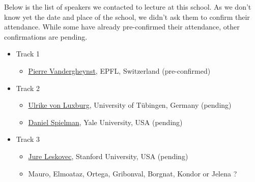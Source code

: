 \documentclass[a4paper]{scrartcl}
\begin{document}
Below is the list of speakers we contacted to lecture at this school. As we
don't know yet the date and place of the school, we didn't ask them to confirm
their attendance. While some have already pre-confirmed their attendance, other
confirmations are pending.
\begin{itemize}
\setlength{\itemsep}{0pt} \setlength{\parskip}{0pt}
\item Track 1
	\begin{itemize}
	\setlength{\itemsep}{0pt} \setlength{\parskip}{0pt}
	\item \href{http://people.epfl.ch/pierre.vandergheynst}
		{Pierre Vandergheynst}, EPFL, Switzerland
		(pre-confirmed)
	\end{itemize}
\item Track 2
	\begin{itemize}
	\setlength{\itemsep}{0pt} \setlength{\parskip}{0pt}
	\item \href{http://www.wsi.uni-tuebingen.de/lehrstuehle/theory-of-machine-learning/people/ulrike-von-luxburg.htmli}
		{Ulrike von Luxburg}, University of Tübingen, Germany
		(pending)
	\item \href{http://www.cs.yale.edu/homes/spielman/}
		{Daniel Spielman}, Yale University, USA
		(pending)
	\end{itemize}
\item Track 3
	\begin{itemize}
	\setlength{\itemsep}{0pt} \setlength{\parskip}{0pt}
	\item \href{http://cs.stanford.edu/people/jure/}
		{Jure Leskovec}, Stanford University, USA
		(pending)
	\item Mauro, Elmoataz, Ortega, Gribonval, Borgnat, Kondor or Jelena ?
	\end{itemize}
\end{itemize}
\end{document}
